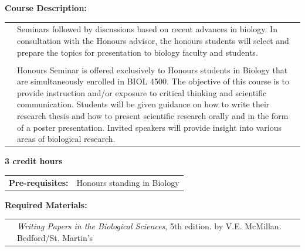 \documentclass[hidelinks]{article}
\begin{document}
	\textbf{Course Description:}\\
	\begin{tabular}{@{} p{2.3cm} p{13.9cm}}
		 & Seminars followed by discussions based on recent advances in biology. In consultation with the Honours advisor, the honours students will select and prepare the topics for presentation to biology faculty and students.\\
		 \\
		 & Honours Seminar is offered exclusively to Honours students in Biology that are simultaneously enrolled in BIOL 4500. The objective of this course is to provide instruction and/or exposure to critical thinking and scientific communication. Students will be given guidance on how to write their research thesis and how to present scientific research orally and in the form of a poster presentation. Invited speakers will provide insight into various areas of biological research.
	\end{tabular}

	\textbf{3 credit hours}

	\begin{tabular}{@{} p{2.6cm} l }
		\textbf{Pre-requisites:} & Honours standing in Biology 
	\end{tabular}

	\textbf{Required Materials:}\\
	\begin{tabular}{@{} p{2.3cm} p{13.9cm}}
		& \emph{Writing Papers in the Biological Sciences}, 5th edition. by V.E. McMillan. Bedford/St. Martin's
	\end{tabular}	
\end{document}
